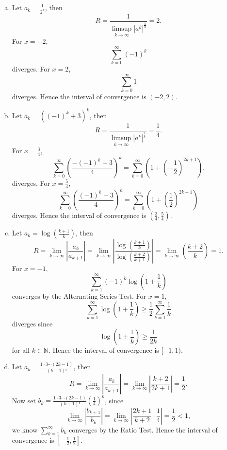 \begin{Exercise}
\begin{enumerate}[a)]
\item
\begin{solution}
Let $a_k = \frac{1}{2^k}$, then $$R=\frac{1}{\limsup_{k\to\infty}|a^k|^{\frac{1}{k}}} = 2.$$
For $x=-2$, $$\sum_{k=0}^{\infty}(-1)^k$$ diverges.
For $x=2$, $$\sum_{k=0}^{\infty}1$$ diverges.
Hence the interval of convergence is $(-2,2)$.
\end{solution}

\item
\begin{solution}
Let $a_k = \left( (-1)^k + 3 \right)^k$, then
$$R=\frac{1}{\limsup_{k\to\infty}|a^k|^{\frac{1}{k}}} = \frac{1}{4}.$$
For $x=\frac{3}{4}$, $$\sum_{k=0}^{\infty}\left( \frac{-(-1)^k-3}{4} \right)^k = \sum_{k=0}^{\infty}\left( 1+\left( -\frac{1}{2} \right)^{2k+1} \right).$$ diverges.
For $x=\frac{5}{4}$, $$\sum_{k=0}^{\infty}\left( \frac{(-1)^k+3}{4} \right)^k = \sum_{k=0}^{\infty}\left( 1+\left( \frac{1}{2} \right)^{2k+1} \right)$$ diverges.
Hence the interval of convergence is $(\frac{3}{4}, \frac{5}{4})$.
\end{solution}

\item
\begin{solution}
Let $a_k = \log\left(\frac{k+1}{k}\right)$, then
$$R=\lim_{k\to\infty}\left| \frac{a_k}{a_{k+1}} \right|
= \lim_{k\to\infty}\left| \frac{\log\left(\frac{k+1}{k}\right)}{\log\left(\frac{k+2}{k+1}\right)} \right|
= \lim_{k\to\infty}\left(\frac{k+2}{k}\right)
= 1.$$
For $x=-1$, $$\sum_{k=1}^{\infty}(-1)^k\log\left(1+\frac{1}{k}\right)$$ converges by the Alternating Series Test. For $x=1$, $$\sum_{k=1}^{\infty}\log\left(1+\frac{1}{k}\right)
\geq \frac{1}{2}\sum_{k=1}^{\infty}\frac{1}{k}$$ diverges
since $$\log(1+\frac{1}{k}) \geq \frac{1}{2k}$$ for all $k\in\mathbb{N}$. Hence the interval of convergence is $[-1,1)$.
\end{solution}

\item
\begin{solution}
Let $a_k = \frac{1\cdot 3\cdots (2k-1)}{(k+1)!}$, then
$$R=\lim_{k\to\infty}\left| \frac{a_k}{a_{k+1}} \right|
= \lim_{k\to\infty}\left| \frac{k+2}{2k+1} \right|
= \frac{1}{2}.$$
Now set $b_k = \frac{1\cdot 3\cdots (2k-1)}{(k+1)!}\left(\frac{1}{4}\right)^k$, since
$$\lim_{k\to\infty}\left| \frac{b_{k+1}}{b_k} \right| 
= \lim_{k\to\infty}\left| \frac{2k+1}{k+2}\cdot\frac{1}{4} \right|
= \frac{1}{2}
< 1,$$
we know $\sum_{k=1}^{\infty}b_k$ converges by the Ratio Test. Hence the interval of convergence is $[-\frac{1}{2},\frac{1}{2}]$.
\end{solution}

\end{enumerate}
\end{Exercise}